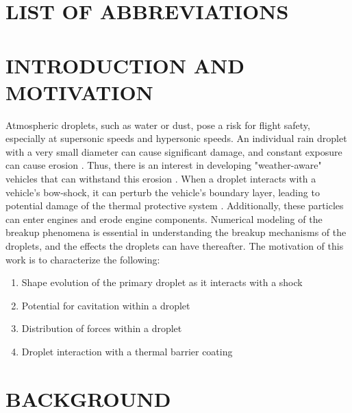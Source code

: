 \documentclass{UCF_ETD}
\begin{document}
\newpage

\chapter{LIST OF ABBREVIATIONS}
\begin{acronym}
\end{acronym}


\mainmatter

\chapter{INTRODUCTION AND MOTIVATION}
Atmospheric droplets, such as water or dust, pose a risk for flight safety, especially at supersonic speeds and hypersonic speeds. An individual rain droplet with a very small diameter can cause significant damage, and constant exposure can cause erosion \cite{LEtson1977}. Thus, there is an interest in developing "weather-aware" vehicles that can withstand this erosion \cite{MOYLAN2013223}. When a droplet interacts with a vehicle's bow-shock, it can perturb the vehicle's boundary layer, leading to potential damage of the thermal protective system \cite{Cook2021}. Additionally, these particles can enter engines and erode engine components. Numerical modeling of the breakup phenomena is essential in understanding the breakup mechanisms of the droplets, and the effects the droplets can have thereafter. The motivation of this work is to characterize the following:

\begin{enumerate}
    \item Shape evolution of the primary droplet as it interacts with a shock
    \item Potential for cavitation within a droplet
    \item Distribution of forces within a droplet
    \item Droplet interaction with a thermal barrier coating
\end{enumerate}

\chapter{BACKGROUND} 
\end{document}
